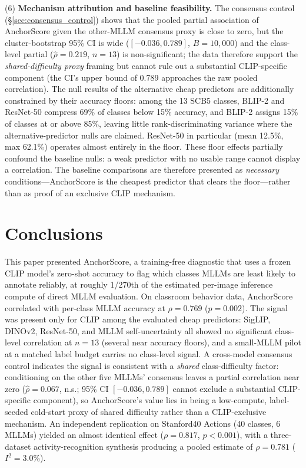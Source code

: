 \documentclass[11pt,a4paper]{article}
\begin{document}
(6) \textbf{Mechanism attribution and baseline feasibility.} The consensus control (\S\ref{sec:consensus_control}) shows that the pooled partial association of AnchorScore given the other-MLLM consensus proxy is close to zero, but the cluster-bootstrap 95\% CI is wide ($[-0.036,0.789]$, $B=10{,}000$) and the class-level partial ($\hat{\rho}=0.219$, $n=13$) is non-significant; the data therefore support the \emph{shared-difficulty proxy} framing but cannot rule out a substantial CLIP-specific component (the CI's upper bound of 0.789 approaches the raw pooled correlation). The null results of the alternative cheap predictors are additionally constrained by their accuracy floors: among the 13 SCB5 classes, BLIP-2 and ResNet-50 compress 69\% of classes below 15\% accuracy, and BLIP-2 assigns 15\% of classes at or above 85\%, leaving little rank-discriminating variance where the alternative-predictor nulls are claimed. ResNet-50 in particular (mean 12.5\%, max 62.1\%) operates almost entirely in the floor. These floor effects partially confound the baseline nulls: a weak predictor with no usable range cannot display a correlation. The baseline comparisons are therefore presented as \emph{necessary} conditions---AnchorScore is the cheapest predictor that clears the floor---rather than as proof of an exclusive CLIP mechanism.


\section{Conclusions}
\label{sec:conclusion}

This paper presented AnchorScore, a training-free diagnostic that uses a frozen CLIP model's zero-shot accuracy to flag which classes MLLMs are least likely to annotate reliably, at roughly 1/270th of the estimated per-image inference compute of direct MLLM evaluation. On classroom behavior data, AnchorScore correlated with per-class MLLM accuracy at $\rho=0.769$ ($p=0.002$). The signal was present only for CLIP among the evaluated cheap predictors: SigLIP, DINOv2, ResNet-50, and MLLM self-uncertainty all showed no significant class-level correlation at $n=13$ (several near accuracy floors), and a small-MLLM pilot at a matched label budget carries no class-level signal. A cross-model consensus control indicates the signal is consistent with a \emph{shared} class-difficulty factor: conditioning on the other five MLLMs' consensus leaves a partial correlation near zero ($\hat{\rho}=0.067$, n.s.; 95\% CI $[-0.036, 0.789]$ cannot exclude a substantial CLIP-specific component), so AnchorScore's value lies in being a low-compute, label-seeded cold-start proxy of shared difficulty rather than a CLIP-exclusive mechanism. An independent replication on Stanford40 Actions (40 classes, 6 MLLMs) yielded an almost identical effect ($\rho=0.817$, $p<0.001$), with a three-dataset activity-recognition synthesis producing a pooled estimate of $\rho=0.781$ ($I^2=3.0\%$).
 
\end{document}
